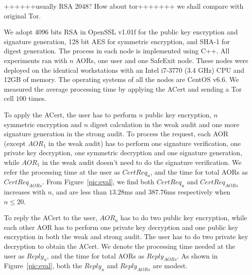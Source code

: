 ++++++usually RSA 2048? How about tor+++++++
we shall compare with original Tor.

We adopt 4096 bits RSA in OpenSSL v1.01f for the public key encryption and signature generation, 128 bit AES for symmetric encryption, and SHA-1 for digest generation.
The process in each node is implemented using C++.
All experiments ran with $n$ AORs, one user and one SafeExit node.
These nodes were deployed on the identical workstations with an Intel i7-3770 (3.4 GHz)
CPU and 12GB of memory.
The operating systems of all the nodes are CentOS v6.6.
We measured the average processing time by applying the ACert and sending a Tor cell $100$ times.



To apply the ACert, the user has to perform $n$ public key encryption, $n$ symmetric encryption and $n$ digest calculation  in the weak audit and one more signature generation in the strong audit.
To process the request, each AOR (except $AOR_1$ in the weak audit) has to perform one signature verification, one private key decryption, one symmetric decryption and one signature generation, while $AOR_1$ in the weak audit doesn't need to do the signature verification.
We refer the processing time at the user as $CertReq_u$, and the time for total AORs as $CertReq_{AORs}$.
From Figure~\ref{pic:eval}, we find both  $CertReq_u$ and $CertReq_{AORs}$ increases with $n$,
 and are less than $13.28$ms and $387.76$ms respectively when $n \leq 20$.

To reply the ACert to the user,  $AOR_n$ has to do two public key encryption, while each other AOR has to perform one private key decryption and one public key encryption in both the weak  and strong audit. The user has to do two private key decryption to obtain the ACert.
We denote the processing time  needed at the user as $Reply_u$, and the time for total AORs as $Reply_{AORs}$.
As shown in Figure~\ref{pic:eval}, both the $Reply_u$ and $Reply_{AORs}$ are modest.


